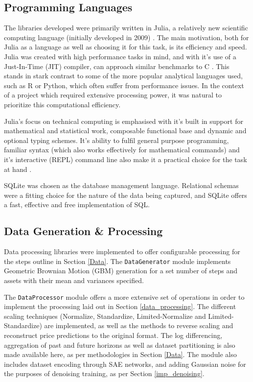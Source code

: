 \documentclass[a4paper,11pt,oneside]{article}
\theoremstyle{plain}
\theoremstyle{definition}
\begin{document}
	
	\subsection{Programming Languages}
	
	The libraries developed were primarily written in Julia, a relatively new scientific computing language (initially developed in 2009) \citep{DCRoot, Julia}. The main motivation, both for Julia as a language as well as choosing it for this task, is its efficiency and speed. Julia was created with high performance tasks in mind, and with it's use of a Just-In-Time (JIT) compiler, can approach similar benchmarks to C \citep{Perkel}. This stands in stark contrast to some of the more popular analytical languages used, such as R or Python, which often suffer from performance issues. In the context of a project which required extensive processing power, it was natural to prioritize this computational efficiency. \newline
	
	Julia's focus on technical computing is emphasised with it's built in support for mathematical and statistical work, composable functional base and dynamic and optional typing schemes. It's ability to fulfil general purpose programming, familiar syntax (which also works effectively for mathematical commands) and it's interactive (REPL) command line also make it a practical choice for the task at hand \citep{Perkel}.\newline
	
	SQLite was chosen as the database management language. Relational schemas were a fitting choice for the nature of the data being captured, and SQLite offers a fast, effective and free implementation of SQL.\newline
	
	
	\subsection{Data Generation \& Processing}
	
	Data processing libraries were implemented to offer configurable processing for the steps outline in Section \ref{Data}. The \texttt{DataGenerator} module \citep{DCDataGenerator} implements Geometric Brownian Motion (GBM) generation for a set number of steps and assets with their mean and variances specified. \newline
	
	The \texttt{DataProcessor} module \citep{DCDataProcessor} offers a more extensive set of operations in order to implement the processing laid out in Section \ref{data_processing}. The different scaling techniques (Normalize, Standardize, Limited-Normalize and Limited-Standardize) are implemented, as well as the methods to reverse scaling and reconstruct price predictions to the original format. The log differencing, aggregation of past and future horizons as well as dataset partitioning is also made available here, as per methodologies in Section \ref{Data}. The module also includes dataset encoding through SAE networks, and adding Gaussian noise for the purposes of denoising training, as per Section \ref{imp_denoising}.
	
\end{document}
